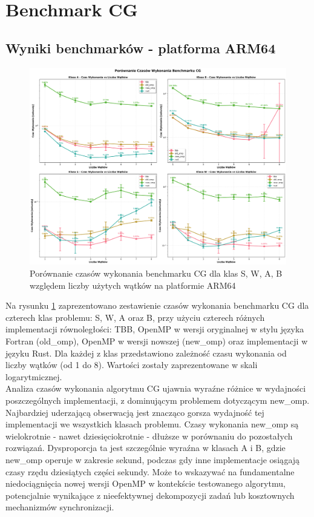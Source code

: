 
\section{Benchmark CG}
\subsection{Wyniki benchmarków - platforma ARM64}

\begin{figure}[H]
    \centering
    \includegraphics[width=\textwidth]{analiza/images/parallel/cg/arm/cg_porownanie_czasow_wykonania.png}
    \caption{Porównanie czasów wykonania benchmarku CG dla klas S, W, A, B względem liczby użytych wątków na platformie ARM64}
    \label{cg_porownanie_czasow_wykonania}
\end{figure}

Na rysunku \ref{cg_porownanie_czasow_wykonania} zaprezentowano zestawienie czasów wykonania benchmarku CG dla czterech klas problemu: S, W, A oraz B, przy użyciu czterech różnych implementacji równoległości: TBB, OpenMP w wersji oryginalnej w stylu języka Fortran (old\_omp), OpenMP w wersji nowszej (new\_omp) oraz implementacji w języku Rust. Dla każdej z klas przedstawiono zależność czasu wykonania od liczby wątków (od 1 do 8). Wartości zostały zaprezentowane w skali logarytmicznej.\\
Analiza czasów wykonania algorytmu CG ujawnia wyraźne różnice w wydajności poszczególnych implementacji, z dominującym problemem dotyczącym new\_omp. Najbardziej uderzającą obserwacją jest znacząco gorsza wydajność tej implementacji we wszystkich klasach problemu. Czasy wykonania new\_omp są wielokrotnie - nawet dziesięciokrotnie - dłuższe w porównaniu do pozostałych rozwiązań. Dysproporcja ta jest szczególnie wyraźna w klasach A i B, gdzie new\_omp operuje w zakresie sekund, podczas gdy inne implementacje osiągają czasy rzędu dziesiątych części sekundy. Może to wskazywać na fundamentalne niedociągnięcia nowej wersji OpenMP w kontekście testowanego algorytmu, potencjalnie wynikające z nieefektywnej dekompozycji zadań lub kosztownych mechanizmów synchronizacji.

